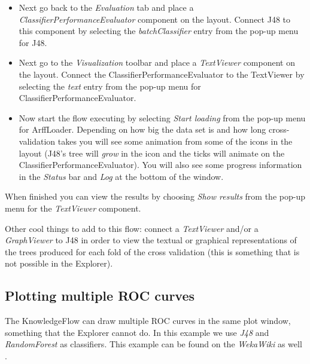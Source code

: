 \documentclass[a4paper]{article}
\begin{document}
\begin{itemize}
	\item Next go back to the \textit{Evaluation} tab and place a
	\textit{ClassifierPerformanceEvaluator} component on the layout. Connect J48
	to this component by selecting the \textit{batchClassifier} entry from the
	pop-up menu for J48.

	\item Next go to the \textit{Visualization} toolbar and place a \textit{TextViewer}
	component on the layout. Connect the ClassifierPerformanceEvaluator to
	the TextViewer by selecting the \textit{text} entry from the pop-up menu for
	ClassifierPerformanceEvaluator.

	\item Now start the flow executing by selecting \textit{Start loading} from the
	pop-up menu for ArffLoader. Depending on how big the data set is and
	how long cross-validation takes you will see some animation from some
	of the icons in the layout (J48's tree will \textit{grow} in the icon and the
	ticks will animate on the ClassifierPerformanceEvaluator). You will
	also see some progress information in the \textit{Status} bar and \textit{Log} at
	the bottom of the window.
\end{itemize}

When finished you can view the results by choosing \textit{Show results} from
the pop-up menu for the \textit{TextViewer} component.

Other cool things to add to this flow: connect a \textit{TextViewer} and/or a
\textit{GraphViewer} to J48 in order to view the textual or graphical
representations of the trees produced for each fold of the cross
validation (this is something that is not possible in the Explorer).


\newpage
\subsection{Plotting multiple ROC curves}
\label{exampleroc}
The KnowledgeFlow can draw multiple ROC curves in the same plot window, something that the 
Explorer cannot do. In this example we use \textit{J48} and \textit{RandomForest}
as classifiers. This example can be found on the \textit{WekaWiki} as well \cite{multipleroc}.

\begin{center}
\end{center}
\end{document}
